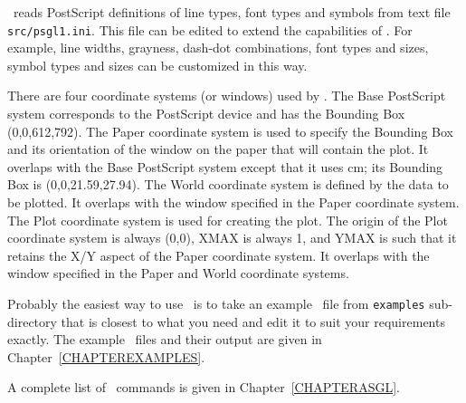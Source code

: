 \ASGL\ reads PostScript definitions of line types, font types and
symbols from text file {\tt src/psgl1.ini}. This file can be edited to
extend the capabilities of \ASGL. For example, line widths, grayness,
dash-dot combinations, font types and sizes, symbol types and sizes
can be customized in this way.

There are four coordinate systems (or windows) used by \ASGL. The Base
PostScript system corresponds to the PostScript device and has the
Bounding Box (0,0,612,792). The Paper coordinate system is used 
to specify the Bounding Box and its orientation of the window 
on the paper that will contain the plot. It overlaps with
the Base PostScript system except that it uses cm; its Bounding Box
is (0,0,21.59,27.94). The World coordinate system is defined by 
the data to be plotted. It overlaps with the window specified in 
the Paper coordinate system. The Plot coordinate system is used for 
creating the plot. The origin of the Plot coordinate system is always (0,0),
XMAX is always 1, and YMAX is such that it retains the X/Y aspect 
of the Paper coordinate system. It overlaps with the window specified
in the Paper and World coordinate systems.

Probably the easiest way to use \ASGL\ is to take an example \TOP\ file
from {\tt examples} sub-directory that is closest to what you need and
edit it to suit your requirements exactly. The example \TOP\ files
and their output are given in Chapter~\ref{CHAPTEREXAMPLES}.

A complete list of \ASGL\ commands is given in Chapter~\ref{CHAPTERASGL}.
